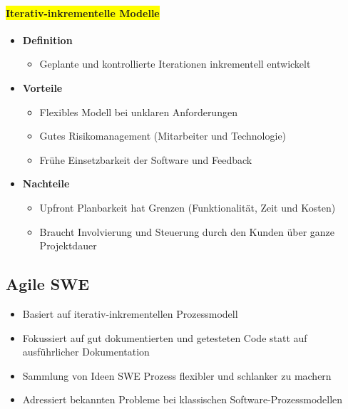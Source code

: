 \documentclass[../ZF_SWEN1.tex]{subfiles}
\begin{document}
\paragraph {\colorbox {yellow}{Iterativ-inkrementelle Modelle}}
\begin{itemize}
    \item \textbf{Definition}
    \begin{itemize}
        \item Geplante und kontrollierte Iterationen inkrementell entwickelt
    \end{itemize}
    \item \textbf{ Vorteile}
    \begin{itemize}
        \item Flexibles Modell bei unklaren Anforderungen
        \item Gutes Risikomanagement (Mitarbeiter und Technologie)
        \item Frühe Einsetzbarkeit der Software und Feedback
    \end{itemize}
    \item \textbf{ Nachteile}
    \begin{itemize}
        \item Upfront Planbarkeit hat Grenzen (Funktionalität, Zeit und Kosten)
        \item Braucht Involvierung und Steuerung durch den Kunden über ganze Projektdauer
    \end{itemize}
\end{itemize}


\subsection{Agile SWE}
\begin{itemize}
    \item Basiert auf iterativ-inkrementellen Prozessmodell
    \item Fokussiert auf gut dokumentierten und getesteten Code statt auf ausführlicher Dokumentation
    \item Sammlung von Ideen SWE Prozess flexibler und schlanker zu machern
    \item Adressiert bekannten Probleme bei klassischen Software-Prozessmodellen
\end{itemize}
\end{document}
